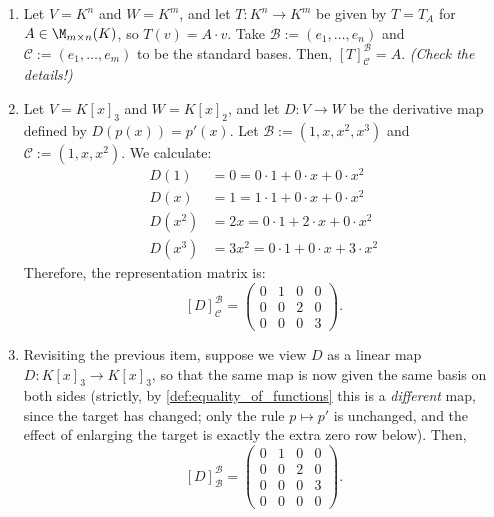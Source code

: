 \begin{example}
\label{ex:representation_matrices}
\begin{enumerate}
    \item  Let $V = K^n$ and $W = K^m$, and let $T: K^n \to K^m$ be given by $T = T_A$ for $A \in \M_{m \times n}(K)$, so $T(v) = A \cdot v$. Take $\mathcal{B} := (e_1, \dots, e_n)$ and $\mathcal{C} := (e_1, \dots, e_m)$ to be the standard bases. Then, $[T]_{\mathcal{C}}^{\mathcal{B}} = A$. \textit{(Check the details!)}
    \item  Let $V = K[x]_3$ and $W = K[x]_2$, and let $D: V \to W$ be the derivative map defined by $D(p(x)) = p'(x)$. Let $\mathcal{B} := (1, x, x^2, x^3)$ and $\mathcal{C} := (1, x, x^2)$. We calculate:
    \begin{align*}
    D(1) &= 0 = 0 \cdot 1 + 0 \cdot x + 0 \cdot x^2 \\
    D(x) &= 1 = 1 \cdot 1 + 0 \cdot x + 0 \cdot x^2 \\
    D(x^2) &= 2x = 0 \cdot 1 + 2 \cdot x + 0 \cdot x^2 \\
    D(x^3) &= 3x^2 = 0 \cdot 1 + 0 \cdot x + 3 \cdot x^2
    \end{align*}
    Therefore, the representation matrix is:
    \[
    [D]_{\mathcal{C}}^{\mathcal{B}} = 
    \begin{pmatrix}
    0 & 1 & 0 & 0 \\
    0 & 0 & 2 & 0 \\
    0 & 0 & 0 & 3
    \end{pmatrix}.
    \]
    \item  Revisiting the previous item, suppose we view $D$ as a linear map $D: K[x]_3 \to K[x]_3$, so that the same map is now given the same basis on both sides (strictly, by \cref{def:equality_of_functions} this is a \emph{different} map, since the target has changed; only the rule $p \mapsto p'$ is unchanged, and the effect of enlarging the target is exactly the extra zero row below). Then,
    \[
    [D]_{\mathcal{B}}^{\mathcal{B}} = 
    \begin{pmatrix}
    0 & 1 & 0 & 0 \\
    0 & 0 & 2 & 0 \\
    0 & 0 & 0 & 3 \\
    0 & 0 & 0 & 0
    \end{pmatrix}.
    \]
\end{enumerate}
\end{example}

